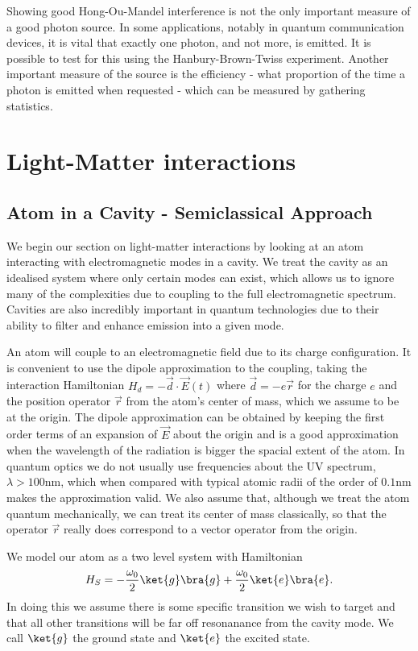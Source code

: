 Showing good Hong-Ou-Mandel interference is not the only important measure of a good photon source. In some applications, notably in quantum communication devices, it is vital that exactly one photon, and not more, is emitted. It is possible to test for this using the Hanbury-Brown-Twiss experiment. Another important measure of the source is the efficiency - what proportion of the time a photon is emitted when requested - which can be measured by gathering statistics.


\section{Light-Matter interactions}

\subsection{Atom in a Cavity - Semiclassical Approach}

We begin our section on light-matter interactions by looking at an atom interacting with electromagnetic modes in a cavity. We treat the cavity as an idealised system where only certain modes can exist, which allows us to ignore many of the complexities due to coupling to the full electromagnetic spectrum. Cavities are also incredibly important in quantum technologies due to their ability to filter and enhance emission into a given mode.

An atom will couple to an electromagnetic field due to its charge configuration. It is convenient to use the dipole approximation to the coupling, taking the interaction Hamiltonian $H_d = -\vec{d}\cdot\vec{E}(t)$ where $\vec{d} = -e \vec{r}$ for the charge $e$ and the position operator $\vec{r}$ from the atom's center of mass, which we assume to be at the origin. The dipole approximation can be obtained by keeping the first order terms of an expansion of $\vec{E}$ about the origin and is a good approximation when the wavelength of the radiation is bigger the spacial extent of the atom. In quantum optics we do not usually use frequencies about the UV spectrum, $\lambda > 100\text{nm}$, which when compared with typical atomic radii of the order of $0.1\text{nm}$ makes the approximation valid. We also assume that, although we treat the atom quantum mechanically, we can treat its center of mass classically, so that the operator $\vec{r}$ really does correspond to a vector operator from the origin. 

We model our atom as a two level system with Hamiltonian
\begin{align}
  H_S = -\frac{\omega_0}{2}\ket{g}\bra{g} +\frac{\omega_0}{2}\ket{e}\bra{e}.
\end{align}
In doing this we assume there is some specific transition we wish to target and that all other transitions will be far off resonanance from the cavity mode. We call $\ket{g}$ the ground state and $\ket{e}$ the excited state. 

